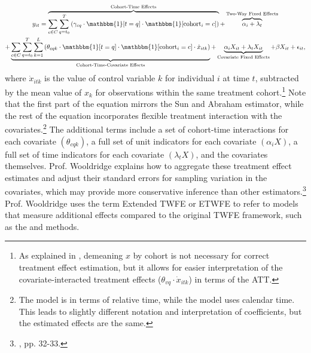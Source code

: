 \documentclass[12pt]{article}
\begin{document}
\begin{multline}
    y_{it} = \overbrace{\sum_{c\in C}\sum_{q=t_0}^T\left(\gamma_{cq}\cdot\mathbbm{1}[t=q]\cdot \mathbbm{1}[\text{cohort}_i=c]\right)}^{\text{Cohort-Time Effects}} + \overbrace{\alpha_i + \lambda_t}^{\text{Two-Way Fixed Effects}} \\
    + \underbrace{\sum_{c\in C}\sum_{q=t_0}^T\sum_{k=1}^L\left(\theta_{cqk}\cdot \mathbbm{1}[t=q]\cdot \mathbbm{1}[\text{cohort}_i=c] \cdot \dot{x}_{itk}\right)}_{\text{Cohort-Time-Covariate Effects}} + \underbrace{\alpha_i X_{it} + \lambda_t X_{it}}_{\text{Covariate Fixed Effects}} + \beta X_{it} +\epsilon_{it},
\end{multline}
where $\dot{x}_{itk}$ is the value of control variable $k$ for individual $i$ at time $t$, subtracted by the mean value of $x_k$ for observations within the same treatment cohort.\footnote{As explained in \citet{wooldridge2021two}, demeaning $x$ by cohort is not necessary for correct treatment effect estimation, but it allows for easier interpretation of the covariate-interacted treatment effects ($\theta_{vq}\cdot\dot{x}_{itk}$) in terms of the ATT.} Note that the first part of the equation mirrors the Sun and Abraham estimator, while the rest of the equation incorporates flexible treatment interaction with the covariates.\footnote{The \citet{sunabr2021a} model is in terms of relative time, while the \citet{wooldridge2021two} model uses calendar time. This leads to slightly different notation and interpretation of coefficients, but the estimated effects are the same.}  The additional terms include a set of cohort-time interactions for each covariate $(\theta_{cqk})$, a full set of unit indicators for each covariate $(\alpha_i X)$, a full set of time indicators for each covariate $(\lambda_t X)$, and the covariates themselves. Prof. Wooldridge explains how to aggregate these treatment effect estimates and adjust their standard errors for sampling variation in the covariates, which may provide more conservative inference than other estimators.\footnote{\citet{wooldridge2021two}, pp. 32-33.} Prof. Wooldridge uses the term Extended TWFE or ETWFE to refer to models that measure additional effects compared to the original TWFE framework, such as the \citet{sunabr2021a} and \citet{wooldridge2021two} methods.
\end{document}
